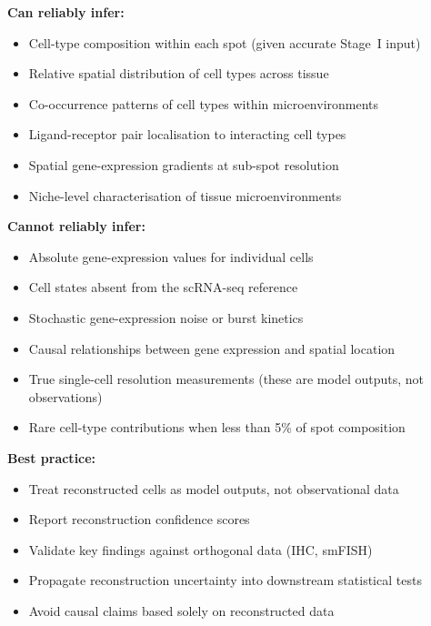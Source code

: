 \begin{tcolorbox}[title=Box 1: What pseudo single-cell reconstruction can and cannot reliably infer]

\textbf{Can reliably infer:}
\begin{itemize}
  \item Cell-type composition within each spot (given accurate Stage~I input)
  \item Relative spatial distribution of cell types across tissue
  \item Co-occurrence patterns of cell types within microenvironments
  \item Ligand-receptor pair localisation to interacting cell types
  \item Spatial gene-expression gradients at sub-spot resolution
  \item Niche-level characterisation of tissue microenvironments
\end{itemize}

\textbf{Cannot reliably infer:}
\begin{itemize}
  \item Absolute gene-expression values for individual cells
  \item Cell states absent from the scRNA-seq reference
  \item Stochastic gene-expression noise or burst kinetics
  \item Causal relationships between gene expression and spatial location
  \item True single-cell resolution measurements (these are model outputs, not observations)
  \item Rare cell-type contributions when less than 5\% of spot composition
\end{itemize}

\textbf{Best practice:}
\begin{itemize}
  \item Treat reconstructed cells as model outputs, not observational data
  \item Report reconstruction confidence scores
  \item Validate key findings against orthogonal data (IHC, smFISH)
  \item Propagate reconstruction uncertainty into downstream statistical tests
  \item Avoid causal claims based solely on reconstructed data
\end{itemize}

\end{tcolorbox}
